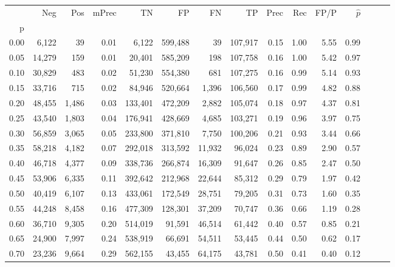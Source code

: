 \begin{tabular}{rrrrrrrrrrrrrrr}
\toprule
{} &     Neg &    Pos & mPrec &       TN &       FP &       FN &       TP &  Prec &   Rec &  FP/P & $\hat{p}$ \\
p    &         &        &       &          &          &          &          &       &       &       &           \\
\midrule
0.00 &   6,122 &     39 &  0.01 &    6,122 &  599,488 &       39 &  107,917 &  0.15 &  1.00 &  5.55 &      0.99 \\
0.05 &  14,279 &    159 &  0.01 &   20,401 &  585,209 &      198 &  107,758 &  0.16 &  1.00 &  5.42 &      0.97 \\
0.10 &  30,829 &    483 &  0.02 &   51,230 &  554,380 &      681 &  107,275 &  0.16 &  0.99 &  5.14 &      0.93 \\
0.15 &  33,716 &    715 &  0.02 &   84,946 &  520,664 &    1,396 &  106,560 &  0.17 &  0.99 &  4.82 &      0.88 \\
0.20 &  48,455 &  1,486 &  0.03 &  133,401 &  472,209 &    2,882 &  105,074 &  0.18 &  0.97 &  4.37 &      0.81 \\
0.25 &  43,540 &  1,803 &  0.04 &  176,941 &  428,669 &    4,685 &  103,271 &  0.19 &  0.96 &  3.97 &      0.75 \\
0.30 &  56,859 &  3,065 &  0.05 &  233,800 &  371,810 &    7,750 &  100,206 &  0.21 &  0.93 &  3.44 &      0.66 \\
0.35 &  58,218 &  4,182 &  0.07 &  292,018 &  313,592 &   11,932 &   96,024 &  0.23 &  0.89 &  2.90 &      0.57 \\
0.40 &  46,718 &  4,377 &  0.09 &  338,736 &  266,874 &   16,309 &   91,647 &  0.26 &  0.85 &  2.47 &      0.50 \\
0.45 &  53,906 &  6,335 &  0.11 &  392,642 &  212,968 &   22,644 &   85,312 &  0.29 &  0.79 &  1.97 &      0.42 \\
0.50 &  40,419 &  6,107 &  0.13 &  433,061 &  172,549 &   28,751 &   79,205 &  0.31 &  0.73 &  1.60 &      0.35 \\
0.55 &  44,248 &  8,458 &  0.16 &  477,309 &  128,301 &   37,209 &   70,747 &  0.36 &  0.66 &  1.19 &      0.28 \\
0.60 &  36,710 &  9,305 &  0.20 &  514,019 &   91,591 &   46,514 &   61,442 &  0.40 &  0.57 &  0.85 &      0.21 \\
0.65 &  24,900 &  7,997 &  0.24 &  538,919 &   66,691 &   54,511 &   53,445 &  0.44 &  0.50 &  0.62 &      0.17 \\
0.70 &  23,236 &  9,664 &  0.29 &  562,155 &   43,455 &   64,175 &   43,781 &  0.50 &  0.41 &  0.40 &      0.12 \\

\end{tabular}
